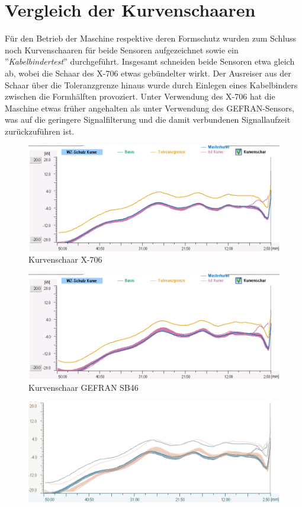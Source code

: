 \documentclass[12pt,a4paper]{article}
\begin{document}
\section{Vergleich der Kurvenschaaren}
Für den Betrieb der Maschine respektive deren Formschutz wurden zum Schluss noch Kurvenschaaren für beide Sensoren aufgezeichnet sowie ein ''\textit{Kabelbindertest}'' durchgeführt. Insgesamt schneiden beide Sensoren etwa gleich ab, wobei die Schaar des X-706 etwas gebündelter wirkt. Der Ausreiser aus der Schaar über die Toleranzgrenze hinaus wurde durch Einlegen eines Kabelbinders zwischen die Formhälften provoziert. Unter Verwendung des X-706 hat die Maschine etwas früher angehalten als unter Verwendung des GEFRAN-Sensors, was auf die geringere Signalfilterung und die damit verbundenen Signallaufzeit zurückzuführen ist.
\begin{figure}[H]
	\centering
	\includegraphics[width=1\linewidth]{imgs/Kurvenschaar_x-706}
	\caption{Kurvenschaar X-706}
	\label{fig:kurvenschaarx-706}
\end{figure}

\begin{figure}[H]
	\centering
	\includegraphics[width=1\linewidth]{imgs/Kurvenschaar_gefran}
	\caption{Kurvenschaar GEFRAN SB46}
	\label{fig:kurvenschaargefran}
\end{figure}
\begin{figure}[H]
	\centering
	\includegraphics[width=1\linewidth]{imgs/overlaypng}
	\caption[Overlay X-706 (blau) und GEFRAN (orange)]{}
	\label{fig:overlaypng}
\end{figure}
\end{document}
